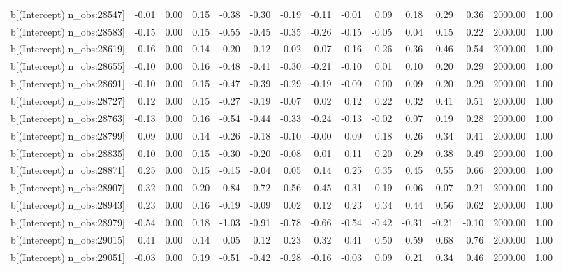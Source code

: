 \begin{table}[ht]
\begin{tabular}{rrrrrrrrrrrrrrr}
  b[(Intercept) n\_obs:28547] & -0.01 & 0.00 & 0.15 & -0.38 & -0.30 & -0.19 & -0.11 & -0.01 & 0.09 & 0.18 & 0.29 & 0.36 & 2000.00 & 1.00 \\ 
  b[(Intercept) n\_obs:28583] & -0.15 & 0.00 & 0.15 & -0.55 & -0.45 & -0.35 & -0.26 & -0.15 & -0.05 & 0.04 & 0.15 & 0.22 & 2000.00 & 1.00 \\ 
  b[(Intercept) n\_obs:28619] & 0.16 & 0.00 & 0.14 & -0.20 & -0.12 & -0.02 & 0.07 & 0.16 & 0.26 & 0.36 & 0.46 & 0.54 & 2000.00 & 1.00 \\ 
  b[(Intercept) n\_obs:28655] & -0.10 & 0.00 & 0.16 & -0.48 & -0.41 & -0.30 & -0.21 & -0.10 & 0.01 & 0.10 & 0.20 & 0.29 & 2000.00 & 1.00 \\ 
  b[(Intercept) n\_obs:28691] & -0.10 & 0.00 & 0.15 & -0.47 & -0.39 & -0.29 & -0.19 & -0.09 & 0.00 & 0.09 & 0.20 & 0.29 & 2000.00 & 1.00 \\ 
  b[(Intercept) n\_obs:28727] & 0.12 & 0.00 & 0.15 & -0.27 & -0.19 & -0.07 & 0.02 & 0.12 & 0.22 & 0.32 & 0.41 & 0.51 & 2000.00 & 1.00 \\ 
  b[(Intercept) n\_obs:28763] & -0.13 & 0.00 & 0.16 & -0.54 & -0.44 & -0.33 & -0.24 & -0.13 & -0.02 & 0.07 & 0.19 & 0.28 & 2000.00 & 1.00 \\ 
  b[(Intercept) n\_obs:28799] & 0.09 & 0.00 & 0.14 & -0.26 & -0.18 & -0.10 & -0.00 & 0.09 & 0.18 & 0.26 & 0.34 & 0.41 & 2000.00 & 1.00 \\ 
  b[(Intercept) n\_obs:28835] & 0.10 & 0.00 & 0.15 & -0.30 & -0.20 & -0.08 & 0.01 & 0.11 & 0.20 & 0.29 & 0.38 & 0.49 & 2000.00 & 1.00 \\ 
  b[(Intercept) n\_obs:28871] & 0.25 & 0.00 & 0.15 & -0.15 & -0.04 & 0.05 & 0.14 & 0.25 & 0.35 & 0.45 & 0.55 & 0.66 & 2000.00 & 1.00 \\ 
  b[(Intercept) n\_obs:28907] & -0.32 & 0.00 & 0.20 & -0.84 & -0.72 & -0.56 & -0.45 & -0.31 & -0.19 & -0.06 & 0.07 & 0.21 & 2000.00 & 1.00 \\ 
  b[(Intercept) n\_obs:28943] & 0.23 & 0.00 & 0.16 & -0.19 & -0.09 & 0.02 & 0.12 & 0.23 & 0.34 & 0.44 & 0.56 & 0.62 & 2000.00 & 1.00 \\ 
  b[(Intercept) n\_obs:28979] & -0.54 & 0.00 & 0.18 & -1.03 & -0.91 & -0.78 & -0.66 & -0.54 & -0.42 & -0.31 & -0.21 & -0.10 & 2000.00 & 1.00 \\ 
  b[(Intercept) n\_obs:29015] & 0.41 & 0.00 & 0.14 & 0.05 & 0.12 & 0.23 & 0.32 & 0.41 & 0.50 & 0.59 & 0.68 & 0.76 & 2000.00 & 1.00 \\ 
  b[(Intercept) n\_obs:29051] & -0.03 & 0.00 & 0.19 & -0.51 & -0.42 & -0.28 & -0.16 & -0.03 & 0.09 & 0.21 & 0.34 & 0.46 & 2000.00 & 1.00 \\ 

\end{tabular}
\end{table}
